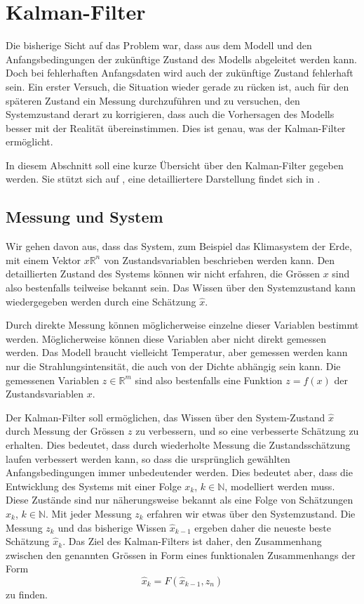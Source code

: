 %
%
%
\section{Kalman-Filter\label{section:kalman-filter}}
Die bisherige Sicht auf das Problem war, dass aus dem Modell und den
Anfangsbedingungen der zukünftige Zustand des Modells abgeleitet werden
kann.
Doch bei fehlerhaften Anfangsdaten wird auch der zukünftige Zustand
fehlerhaft sein.
Ein erster Versuch, die Situation wieder gerade zu rücken ist, auch für
den späteren Zustand ein Messung durchzuführen und zu versuchen,
den Systemzustand derart zu korrigieren, dass auch die Vorhersagen des
Modells besser mit der Realität übereinstimmen.
Dies ist genau, was der Kalman-Filter ermöglicht.

In diesem Abschnitt soll eine kurze Übersicht über den Kalman-Filter
gegeben werden.
Sie stützt sich auf \cite{skript:catlin}, eine detailliertere Darstellung
findet sich in \cite[Kapitel 8]{skript:wrstatskript}.

\subsection{Messung und System\label{subsection:messung und system}}
Wir gehen davon aus, dass das System, zum Beispiel das Klimasystem der Erde,
mit einem Vektor $x\mathbb R^n$ von Zustandsvariablen beschrieben werden
kann.
Den detaillierten Zustand des Systems können wir nicht erfahren, die
Grössen $x$ sind also bestenfalls teilweise bekannt sein.
Das Wissen über den Systemzustand kann wiedergegeben werden
durch eine Schätzung $\hat x$.

Durch direkte Messung können möglicherweise einzelne dieser Variablen
bestimmt werden.
Möglicherweise können diese Variablen aber nicht direkt gemessen werden.
Das Modell braucht vielleicht Temperatur, aber gemessen werden kann nur
die Strahlungsintensität, die auch von der Dichte abhängig sein kann.
Die gemessenen Variablen $z\in\mathbb R^m$ sind also bestenfalls eine
Funktion $z=f(x)$ der Zustandsvariablen $x$.

Der Kalman-Filter soll ermöglichen, das Wissen über den System-Zustand
$\hat x$ durch Messung der Grössen $z$ zu verbessern, und so eine
verbesserte Schätzung zu erhalten.
Dies bedeutet, dass durch wiederholte Messung die Zustandsschätzung
laufen verbessert werden kann, so dass die ursprünglich gewählten 
Anfangsbedingungen immer unbedeutender werden.
Dies bedeutet aber, dass die Entwicklung des Systems mit einer Folge
$x_k$, $k\in\mathbb N$, modelliert werden muss.
Diese Zustände sind nur näherungsweise bekannt als eine Folge
von Schätzungen $\hat{x}_k$, $k\in\mathbb N$.
Mit jeder Messung $z_k$ erfahren wir etwas über den Systemzustand.
Die Messung $z_k$ und das bisherige Wissen $\hat{x}_{k-1}$ ergeben
daher die neueste beste Schätzung $\hat{x}_k$.
Das Ziel des Kalman-Filters ist daher, den Zusammenhang zwischen den
genannten Grössen in Form eines funktionalen Zusammenhangs der Form
\begin{equation}
\hat{x}_k = F(\hat{x}_{k-1},z_n)
\label{skript:filterbasis}
\end{equation}
zu finden.

